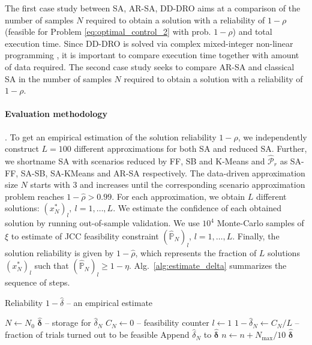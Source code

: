 The first case study between SA, AR-SA, DD-DRO aims at a comparison of the number of samples $N$ required to obtain a solution with a reliability of $1-\rho$ (feasible for Problem \eqref{eq:optimal_control_2} with prob. $1-\rho$) and total execution time. Since DD-DRO is solved via complex mixed-integer non-linear programming \cite{chen2024data}, it is important to compare execution time together with amount of data required.
The second case study seeks to compare AR-SA and classical SA in the number of samples $N$ required to obtain a solution with a reliability of $1-\rho$.%

\paragraph{Evaluation methodology}.
To get an empirical estimation of the solution reliability $1-\hat{\rho}$, we independently construct $L=100$ different approximations for both  SA and reduced SA. Further, we shortname SA with scenarios reduced by FF, SB and K-Means and $\hat{\mathcal{P}}_r$ as SA-FF, SA-SB, SA-KMeans and AR-SA respectively. The data-driven approximation size $N$ starts with $3$ and increases until the corresponding scenario approximation problem reaches $1-\hat{\rho} > 0.99$. For each approximation, we obtain $L$ different solutions: $(x^*_N)_l, ~ l=1, \dots, L$. We estimate the confidence of each obtained solution by running out-of-sample validation. We use $10^4$ Monte-Carlo samples of $\xi$ to estimate of JCC feasibility constraint $(\hat{\mathbb{P}}_N)_l$, $l=1, \dots, L$. Finally, the solution reliability is given by $1 - \hat{\rho}$, which represents the fraction of $L$ solutions $(x^*_N)_l$ such that $(\hat{\mathbb{P}}_N)_l \geq 1 - \eta$. 
Alg.~\ref{alg:estimate_delta} summarizes the sequence of steps.

\begin{algorithm}[ht]
\caption{Reliability $1-\hat{\delta}$ -- an empirical estimate}\label{alg:estimate_delta}
$N \gets N_0$\;
$\hat{ \boldsymbol \delta}$ -- storage for $\hat{\delta}_N$\;
{
     $C_N \gets 0$ -- feasibility counter\;
     $l \gets 1$\;
    $1-\hat{\delta}_N \gets C_N / L$ -- fraction of trials turned out to be feasible \;
    Append $\hat{\delta}_N$ to $\hat{ \boldsymbol \delta}$ \;
    $n  \gets n + N_{\max}/ 10$\;
}
\Return $\hat{ \boldsymbol \delta}$
\end{algorithm}

